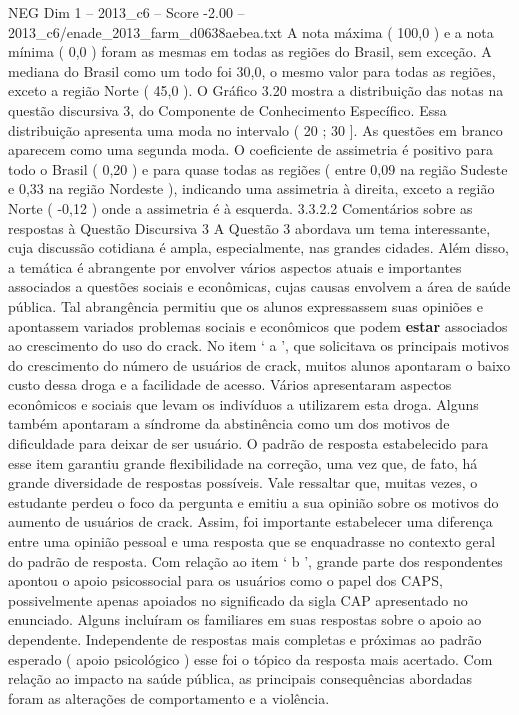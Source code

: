 \begin{textsample}{NEG Dim 1 – 2013\_c6 – Score -2.00 – 2013\_c6/enade\_2013\_farm\_d0638aebea.txt}
A nota máxima ( 100,0 ) e a nota mínima ( 0,0 ) foram as mesmas em todas as regiões do Brasil, sem exceção.
A mediana do Brasil como um todo foi 30,0, o mesmo valor para todas as regiões, exceto a região Norte ( 45,0 ).
O Gráfico 3.20 mostra a distribuição das notas na questão discursiva 3, do Componente de Conhecimento Específico.
Essa distribuição apresenta uma moda no intervalo ( 20 ; 30 ].
As questões em branco aparecem como uma segunda moda.
O coeficiente de assimetria é positivo para todo o Brasil ( 0,20 ) e para quase todas as regiões ( entre 0,09 na região Sudeste e 0,33 na região Nordeste ), indicando uma assimetria à direita, exceto a região Norte ( -0,12 ) onde a assimetria é à esquerda. 3.3.2.2 Comentários sobre as respostas à Questão Discursiva 3 A Questão 3 abordava um tema interessante, cuja discussão cotidiana é ampla, especialmente, nas grandes cidades.
Além disso, a temática é abrangente por envolver vários aspectos atuais e importantes associados a questões sociais e econômicas, cujas causas envolvem a área de saúde pública.
Tal abrangência permitiu que os alunos expressassem suas opiniões e apontassem variados problemas sociais e econômicos que podem \textbf{estar} associados ao crescimento do uso do crack.
No item ‘ a ’, que solicitava os principais motivos do crescimento do número de usuários de crack, muitos alunos apontaram o baixo custo dessa droga e a facilidade de acesso.
Vários apresentaram aspectos econômicos e sociais que levam os indivíduos a utilizarem esta droga.
Alguns também apontaram a síndrome da abstinência como um dos motivos de dificuldade para deixar de ser usuário.
O padrão de resposta estabelecido para esse item garantiu grande flexibilidade na correção, uma vez que, de fato, há grande diversidade de respostas possíveis.
Vale ressaltar que, muitas vezes, o estudante perdeu o foco da pergunta e emitiu a sua opinião sobre os motivos do aumento de usuários de crack.
Assim, foi importante estabelecer uma diferença entre uma opinião pessoal e uma resposta que se enquadrasse no contexto geral do padrão de resposta.
Com relação ao item ‘ b ’, grande parte dos respondentes apontou o apoio psicossocial para os usuários como o papel dos CAPS, possivelmente apenas apoiados no significado da sigla CAP apresentado no enunciado.
Alguns incluíram os familiares em suas respostas sobre o apoio ao dependente.
Independente de respostas mais completas e próximas ao padrão esperado ( apoio psicológico ) esse foi o tópico da resposta mais acertado.
Com relação ao impacto na saúde pública, as principais consequências abordadas foram as alterações de comportamento e a violência.

\end{textsample}
